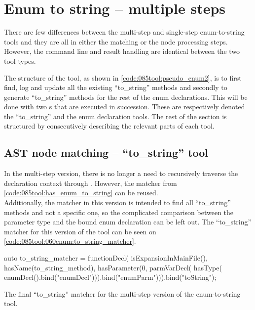 \section{Enum to string -- multiple steps}

There are few differences between the multi-step and single-step enum-to-string tools and they are all in either the matching or the node processing steps. However, the command line and result handling are identical between the two tool types.

The structure of the tool, as shown in \cref{code:085tool:pseudo_enum2}, is to first find, log and update all the existing ``to\_string'' methods and secondly to generate ``to\_string'' methods for the rest of the enum declarations.
This will be done with two s that are executed in succession. These are respectively denoted the ``to\_string'' and the enum declaration tools. The rest of the section is structured by consecutively describing the relevant parts of each tool.

\subsection{AST node matching -- ``to\_string'' tool}
In the multi-step version, there is no longer a need to recursively traverse the declaration context through .
However, the  matcher from \cref{code:085tool:has_enum_to_string} can be reused.\\
Additionally, the matcher in this version is intended to find all ``to\_string'' methods and not a specific one, so the complicated comparison between the parameter type and the bound enum declaration can be left out.
The ``to\_string'' matcher for this version of the tool can be seen on \cref{code:085tool:060enum:to_string_matcher}.

\begin{listing}[H]
    \begin{cppcode}
auto to_string_matcher = functionDecl(
  isExpansionInMainFile(),
  hasName(to_string_method),
  hasParameter(0, 
    parmVarDecl(
	  hasType(
	    enumDecl().bind("enumDecl"))).bind("enumParm"))).bind("toString");
    \end{cppcode}
    \caption{The final ``to\_string'' matcher for the multi-step version of the enum-to-string tool.}
    \label{code:085tool:060enum:to_string_matcher}
\end{listing}

